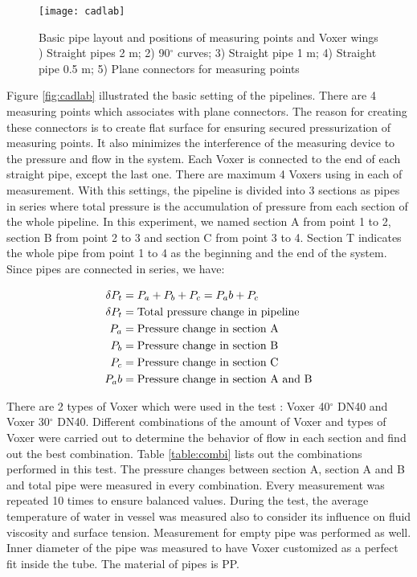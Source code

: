\begin{figure}[h]
  \centering
  \texttt{[image: cadlab]}
  \caption{ Basic pipe layout and positions of measuring points and Voxer wings ) Straight pipes 2 m; 2) 90$^{\circ}$ curves; 3) Straight pipe 1 m; 4) Straight pipe 0.5 m; 5) Plane connectors for measuring points}
  \label{fig:cadlab}
\end{figure}

Figure \vref{fig:cadlab} illustrated the basic setting of the pipelines. There are 4 measuring points which associates with plane connectors. The reason for creating these connectors is to create flat surface for ensuring secured pressurization of measuring points. It also minimizes the interference of the measuring device to the pressure and flow in the system. Each Voxer is connected to the end of each straight pipe, except the last one. There are maximum 4 Voxers using in each of measurement. With this settings, the pipeline is divided into 3 sections as pipes in series where total pressure is the accumulation of pressure from each section of the whole pipeline. In this experiment, we named section A from point 1 to 2, section B from point 2 to 3 and section C from point 3 to 4. Section T indicates the whole pipe from point 1 to 4 as the beginning and the end of the system. 
Since pipes are connected in series, we have:

\begin{align}
\delta P_t&= P_a + P_b + P_c = P_ab + P_c \\
\delta P_t&= \textnormal{Total pressure change in pipeline} \\
P_a&= \textnormal{Pressure change in section A} \\
P_b&= \textnormal{Pressure change in section B} \\
P_c&= \textnormal{Pressure change in section C} \\
P_ab&= \textnormal{Pressure change in section A and B} \\
\end{align}

There are 2 types of Voxer which were used in the test : Voxer 40$^{\circ}$ DN40 and Voxer 30$^{\circ}$ DN40.  Different combinations of the amount of Voxer and types of Voxer were carried out to determine the behavior of flow in each section and find out the best combination. Table \ref{table:combi} lists out the combinations performed in this test. The pressure changes between section A, section A and B and total pipe were measured in every combination. Every measurement was repeated 10 times to ensure balanced values. During the test, the average temperature of water in vessel was measured also to consider its influence on fluid viscosity and surface tension. Measurement for empty pipe was performed as well. Inner diameter of the pipe was measured to have Voxer customized as a perfect fit inside the tube. The material of pipes is PP.

